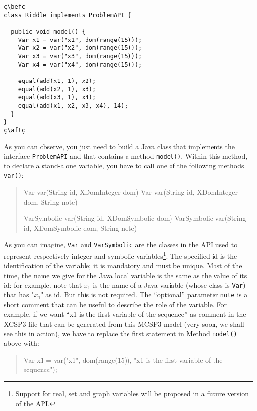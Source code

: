 \documentclass[10pt]{article}
\def\xt{{\rm XCSP3}\xspace}
\newcommand{\nn}[1]{{\tt #1}} %
\def\mt{{\rm MCSP3}\xspace}
\def\xt{{\rm XCSP3}\xspace}
\newenvironment{myvb}{\endgraf\small\verbatim}{\endverbatim}
\def\bef{\rule{10cm}{0.1mm}} %
\def\aft{\rule{10cm}{0.1mm}\medskip}
\begin{document}
\begin{lstlisting}
ç\befç
class Riddle implements ProblemAPI {

  public void model() {
    Var x1 = var("x1", dom(range(15)));
    Var x2 = var("x2", dom(range(15)));
    Var x3 = var("x3", dom(range(15)));
    Var x4 = var("x4", dom(range(15)));
    
    equal(add(x1, 1), x2);
    equal(add(x2, 1), x3);
    equal(add(x3, 1), x4);
    equal(add(x1, x2, x3, x4), 14);
  }
}
ç\aftç
\end{lstlisting}

As you can observe, you just need to build a Java class that implements the interface \nn{ProblemAPI} and that contains a method \nn{model()}.
Within this method, to declare a stand-alone variable, you have to call one of the following methods \nn{var()}: 

\begin{quote}
\begin{myvb}
Var var(String id, XDomInteger dom) 
Var var(String id, XDomInteger dom, String note)

VarSymbolic var(String id, XDomSymbolic dom) 
VarSymbolic var(String id, XDomSymbolic dom, String note)
\end{myvb}
\end{quote}

As you can imagine, \nn{Var} and \nn{VarSymbolic} are the classes in the API used to represent respectively integer and symbolic variables\footnote{Support for real, set and graph variables will be proposed in a future version of the API.}.
The specified id is the identification of the variable; it is mandatory and must be unique.
Most of the time, the name we give for the Java local variable is the same as the value of its id: for example, note that $x_1$ is the name of a Java variable (whose class is \nn{Var}) that has "$x_1$" as id.
But this is not required.
The ``optional'' parameter \nn{note} is a short comment that can be useful to describe the role of the variable.
For example, if we want ``x1 is the first variable of the sequence'' as comment in the \xt file that can be generated from this \mt model (very soon, we shall see this in action), we have to replace the first statement in Method \nn{model()} above with:

\begin{quote}
\begin{myvb}
Var x1 = var("x1", dom(range(15)), "x1 is the first variable of the sequence");
\end{myvb}
\end{quote}
\end{document}
